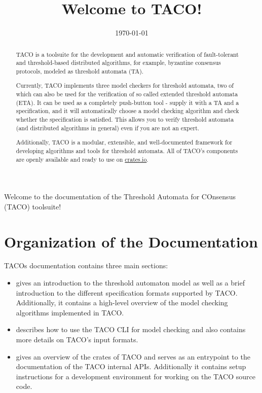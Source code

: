 \documentclass{article}
\title{Welcome to TACO!}
\date{\today}
\begin{document}
    \maketitle
    
    Welcome to the documentation of the Threshold Automata for COnsensus (TACO) toolsuite! 

    \begin{abstract}
    TACO is a toolsuite for the development and automatic verification of fault-tolerant and threshold-based distributed algorithms, for example, byzantine consensus protocols, modeled as threshold automata (TA).

    Currently, TACO implements three model checkers for threshold automata, two of which can also be used for the verification of so called extended threshold automata (ETA).
    It can be used as a completely push-button tool - supply it with a TA and a specification, and it will automatically choose a model checking algorithm and check whether the specification is satisfied.
    This allows you to verify threshold automata (and distributed algorithms in general) even if you are not an expert.

    Additionally, TACO is a modular, extensible, and well-documented framework for developing algorithms and tools for threshold automata. All of TACO's components are openly available and ready to use on \href{https://crates.io}{crates.io}.
    \end{abstract}

    \section{Organization of the Documentation}

    TACOs documentation contains three main sections:

    \begin{itemize}[noitemsep,topsep=5pt]
    
        \item \href{./theoretical-background.tex}{} gives an introduction to the threshold automaton model as well as a brief introduction to the different specification formats supported by TACO.
            Additionally, it contains a high-level overview of the model checking algorithms implemented in TACO.
        
        \item \href{./usage-cli.md}{} describes how to use the TACO CLI for model checking and also contains more details on TACO's input formats.
        
        \item \href{./dev-docs.md}{} gives an overview of the crates of TACO and serves as an entrypoint to the documentation of the TACO internal APIs. Additionally it contains setup instructions for a development environment for working on the TACO source code.
        
    \end{itemize}
\end{document}
